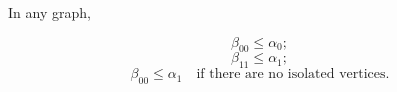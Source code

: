In any graph,

$$\beta_{00} \leq \alpha_0;$$
$$\beta_{11} \leq \alpha_1;$$
$$\beta_{00} \leq \alpha_1 \quad \text{if there are no isolated vertices.}$$

